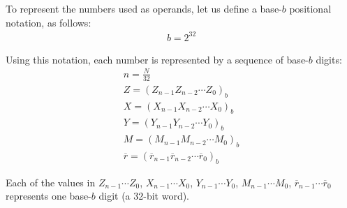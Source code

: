 \documentclass[main\_\_EN.tex]{subfiles}
\begin{document}
To represent the numbers used as operands, let us define a base-\begin{math}b\end{math} positional notation, as follows:
\begin{gather*}
    b = 2^{32}
\end{gather*}

Using this notation, each number is represented by a sequence of base-\begin{math}b\end{math} digits:
\begin{gather*}
    n = \frac{N}{32} \\
    Z = ( Z_{n-1} Z_{n-2} \cdots Z_{0} )_{b} \\
    X = ( X_{n-1} X_{n-2} \cdots X_{0} )_{b} \\
    Y = ( Y_{n-1} Y_{n-2} \cdots Y_{0} )_{b} \\
    M = ( M_{n-1} M_{n-2} \cdots M_{0} )_{b} \\
    \overline{r} = ( \overline{r}_{n-1} \overline{r}_{n-2} \cdots \overline{r}_{0} )_{b}
\end{gather*}

Each of the values in
\begin{math}Z_{n-1} \cdots Z_{0}\end{math},
\begin{math}X_{n-1} \cdots X_{0}\end{math},
\begin{math}Y_{n-1} \cdots Y_{0}\end{math},
\begin{math}M_{n-1} \cdots M_{0}\end{math},
\begin{math}\overline{r}_{n-1}\cdots \overline{r}_{0}\end{math} represents one base-\begin{math}b\end{math} digit (a 32-bit word).
\end{document}
